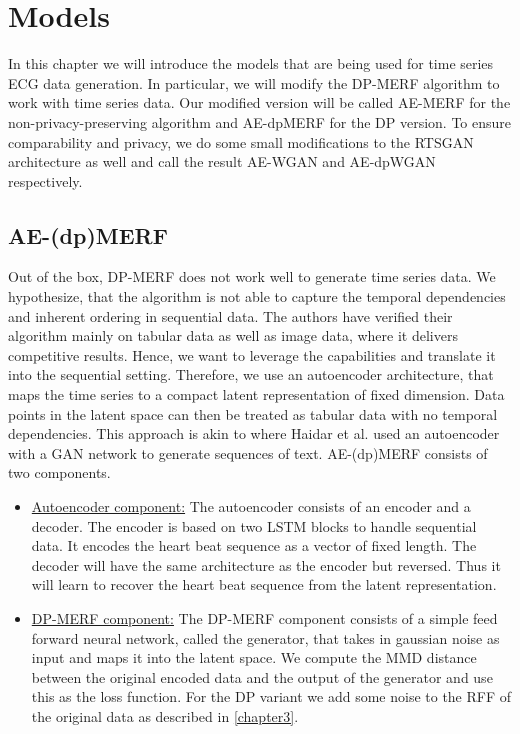 \section{Models}\label{chapter4}
In this chapter we will introduce the models that are being used for time series ECG data generation. In particular, we will modify the DP-MERF algorithm to work with time series data. Our modified version will be called AE-MERF for the non-privacy-preserving algorithm and AE-dpMERF for the DP version. To ensure comparability and privacy, we do some small modifications to the RTSGAN architecture as well and call the result AE-WGAN and AE-dpWGAN respectively.

\subsection{AE-(dp)MERF}
Out of the box, DP-MERF does not work well to generate time series data. We hypothesize, that the algorithm is not able to capture the temporal dependencies and inherent ordering in sequential data. The authors have verified their algorithm mainly on tabular data as well as image data, where it delivers competitive results. Hence, we want to leverage the capabilities and translate it into the sequential setting. Therefore, we use an autoencoder architecture, that maps the time series to a compact latent representation of fixed dimension. Data points in the latent space can then be treated as tabular data with no temporal dependencies. This approach is akin to \parencite{gan_softtext} where Haidar et al. used an autoencoder with a GAN network to generate sequences of text. AE-(dp)MERF consists of two components.
\begin{itemize}
    \item \underline{Autoencoder component:} The autoencoder consists of an encoder and a decoder. The encoder is based on two LSTM blocks to handle sequential data. It encodes the heart beat sequence as a vector of fixed length. The decoder will have the same architecture as the encoder but reversed. Thus it will learn to recover the heart beat sequence from the latent representation.
    \item \underline{DP-MERF component:} The DP-MERF component consists of a simple feed forward neural network, called the generator, that takes in gaussian noise as input and maps it into the latent space. We compute the MMD distance between the original encoded data and the output of the generator and use this as the loss function. For the DP variant we add some noise to the RFF of the original data as described in \cref{chapter3}.
\end{itemize}

